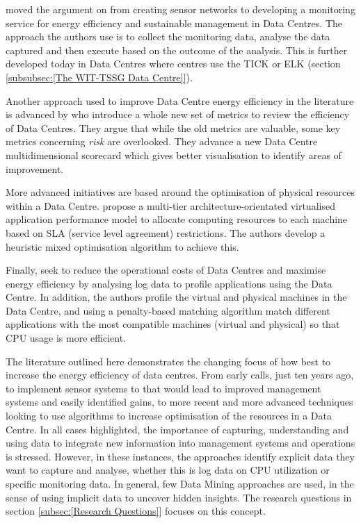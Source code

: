 \documentclass[12pt]{scrartcl}
\begin{document}
\citet{edsbas.DFD37F4F20160101} moved the argument on from creating sensor networks to developing a monitoring service for energy efficiency and sustainable management in Data Centres. The approach the authors use is to collect the monitoring data, analyse the data captured and then execute based on the outcome of the analysis. This is further developed today in Data Centres where centres use the TICK or ELK (section \ref{subsubsec:[The WIT-TSSG Data Centre]}).  

Another approach used to improve Data Centre energy efficiency in the literature is advanced by \citet{edsdoj.99f37e7899fb4fcaabdaa81e395626c420180101} who introduce a whole new set of metrics to review the efficiency of Data Centres. They argue that while the old metrics are valuable, some key metrics concerning \emph{risk} are overlooked. They advance a new Data Centre multidimensional scorecard which gives better visualisation to identify areas of improvement. 

More advanced initiatives are based around the optimisation of physical resources within a Data Centre. \citet{10234066620151001} propose a multi-tier architecture-orientated virtualised application performance model to allocate computing resources to each machine based on SLA (service level agreement) restrictions. The authors develop a heuristic mixed optimisation algorithm to achieve this.

Finally, \citet{VASUDEVAN201794} seek to reduce the operational costs of Data Centres and maximise energy efficiency by analysing log data to profile applications using the Data Centre. In addition, the authors profile the virtual and physical machines in the Data Centre, and using a penalty-based matching algorithm match different applications with the most compatible machines (virtual and physical) so that CPU usage is more efficient. 

The literature outlined here demonstrates the changing focus of how best to increase the energy efficiency of data centres. From early calls, just ten years ago, to implement sensor systems to that would lead to improved management systems and easily identified gains, to more recent and more advanced techniques looking to use algorithms to increase optimisation of the resources in a Data Centre. In all cases highlighted, the importance of capturing, understanding and using data to integrate new information into management systems and operations is stressed. However, in these instances, the approaches identify explicit data they want to capture and analyse, whether this is log data on CPU utilization or specific monitoring data. In general, few Data Mining approaches are used, in the sense of using implicit data to uncover hidden insights. The research questions in section \ref{subsec:[Research Questions]} focuses on this concept.  
\end{document}
